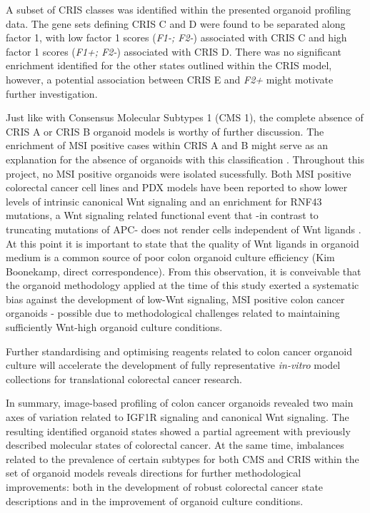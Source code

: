 \begin{flushleft}
A subset of CRIS classes was identified within the presented organoid profiling data. The gene sets defining CRIS C and D were found to be separated along factor 1, with low factor 1 scores (\textit{F1-; F2-}) associated with CRIS C and high factor 1 scores (\textit{F1+; F2-}) associated with CRIS D. There was no significant enrichment identified for the other states outlined within the CRIS model, however, a potential association between CRIS E and \textit{F2+} might motivate further investigation.
\par

Just like with Consensus Molecular Subtypes 1 (CMS 1), the complete absence of CRIS A or CRIS B organoid models is worthy of further discussion. The enrichment of MSI positive cases within CRIS A and B might serve as an explanation for the absence of organoids with this classification \citep{isellaSelectiveAnalysisCancercell2017a}. Throughout this project, no MSI positive organoids were isolated sucessfully. Both MSI positive colorectal cancer cell lines \citep{imkellerMetabolicBalanceColorectal2022} and PDX models \citep{isellaSelectiveAnalysisCancercell2017a} have been reported to show lower levels of intrinsic canonical Wnt signaling and an enrichment for RNF43 mutations, a Wnt signaling related functional event that -in contrast to truncating mutations of APC- does not render cells independent of Wnt ligands \citep{vandeweteringProspectiveDerivationLiving2015}. At this point it is important to state that the quality of Wnt ligands in organoid medium is a common source of poor colon organoid culture efficiency (Kim Boonekamp, direct correspondence). From this observation, it is conveivable that the organoid methodology applied at the time of this study exerted a systematic bias against the development of low-Wnt signaling, MSI positive colon cancer organoids - possible due to methodological challenges related to maintaining sufficiently Wnt-high organoid culture conditions. 
\par
Further standardising and optimising reagents related to colon cancer organoid culture will accelerate the development of fully representative \textit{in-vitro} model collections for translational colorectal cancer research. 

In summary, image-based profiling of colon cancer organoids revealed two main axes of variation related to IGF1R signaling and canonical Wnt signaling. The resulting identified organoid states showed a partial agreement with previously described molecular states of colorectal cancer. At the same time, imbalances related to the prevalence of certain subtypes for both CMS and CRIS within the set of organoid models reveals directions for further methodological improvements: both in the development of robust colorectal cancer state descriptions and in the improvement of organoid culture conditions. 



\end{flushleft}
